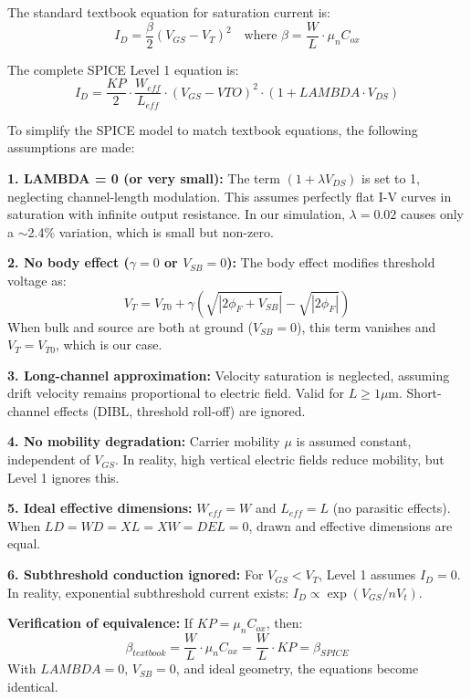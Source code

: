\documentclass[a4paper,12pt]{article}
\begin{document}
The standard textbook equation for saturation current is:
\begin{equation}
I_D = \frac{\beta}{2}(V_{GS} - V_T)^2 \quad \text{where } \beta = \frac{W}{L} \cdot \mu_n C_{ox}
\end{equation}

The complete SPICE Level 1 equation is:
\begin{equation}
I_D = \frac{KP}{2} \cdot \frac{W_{eff}}{L_{eff}} \cdot (V_{GS} - VTO)^2 \cdot (1 + LAMBDA \cdot V_{DS})
\end{equation}

To simplify the SPICE model to match textbook equations, the following assumptions are made:

\textbf{1. LAMBDA = 0 (or very small):}
The term $(1 + \lambda V_{DS})$ is set to 1, neglecting channel-length modulation. This assumes perfectly flat I-V curves in saturation with infinite output resistance. In our simulation, $\lambda = 0.02$ causes only a $\sim$2.4\% variation, which is small but non-zero.

\textbf{2. No body effect ($\gamma = 0$ or $V_{SB} = 0$):}
The body effect modifies threshold voltage as:
\begin{equation}
V_T = V_{T0} + \gamma(\sqrt{|2\phi_F + V_{SB}|} - \sqrt{|2\phi_F|})
\end{equation}
When bulk and source are both at ground ($V_{SB} = 0$), this term vanishes and $V_T = V_{T0}$, which is our case.

\textbf{3. Long-channel approximation:}
Velocity saturation is neglected, assuming drift velocity remains proportional to electric field. Valid for $L \geq 1\mu$m. Short-channel effects (DIBL, threshold roll-off) are ignored.

\textbf{4. No mobility degradation:}
Carrier mobility $\mu$ is assumed constant, independent of $V_{GS}$. In reality, high vertical electric fields reduce mobility, but Level 1 ignores this.

\textbf{5. Ideal effective dimensions:}
$W_{eff} = W$ and $L_{eff} = L$ (no parasitic effects). When $LD = WD = XL = XW = DEL = 0$, drawn and effective dimensions are equal.

\textbf{6. Subthreshold conduction ignored:}
For $V_{GS} < V_T$, Level 1 assumes $I_D = 0$. In reality, exponential subthreshold current exists: $I_D \propto \exp(V_{GS}/nV_t)$.

\textbf{Verification of equivalence:}
If $KP = \mu_n C_{ox}$, then:
\begin{equation}
\beta_{textbook} = \frac{W}{L} \cdot \mu_n C_{ox} = \frac{W}{L} \cdot KP = \beta_{SPICE}
\end{equation}
With $LAMBDA = 0$, $V_{SB} = 0$, and ideal geometry, the equations become identical.
\end{document}
